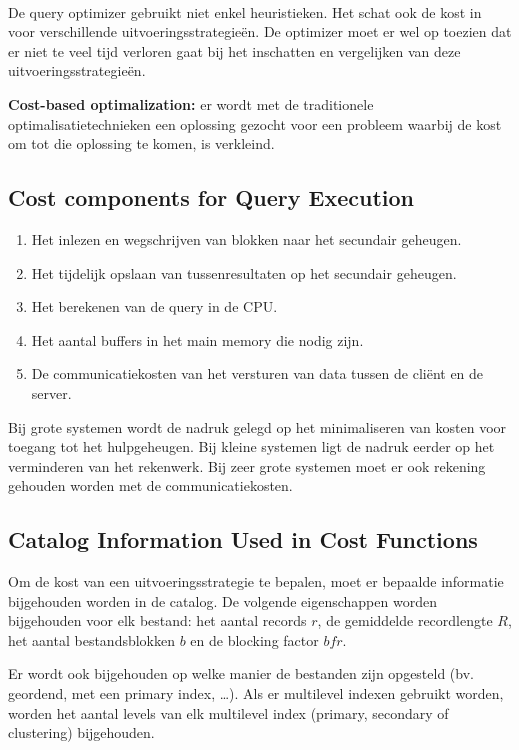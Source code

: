 ~

\noindent De query optimizer gebruikt niet enkel heuristieken. Het schat ook de kost in voor verschillende uitvoeringsstrategie\"en. De optimizer moet er wel op toezien dat er niet te veel tijd verloren gaat bij het inschatten en vergelijken van deze uitvoeringsstrategie\"en.

\textbf{Cost-based optimalization:} er wordt met de traditionele optimalisatietechnieken een oplossing gezocht voor een probleem waarbij de kost om tot die oplossing te komen, is verkleind.


\subsection{Cost components for Query Execution}
\begin{enumerate}
	\item Het inlezen en wegschrijven van blokken naar het secundair geheugen.

	\item Het tijdelijk opslaan van tussenresultaten op het secundair geheugen.

	\item Het berekenen van de query in de CPU.

	\item Het aantal buffers in het main memory die nodig zijn.

	\item De communicatiekosten van het versturen van data tussen de cli\"ent en de server.
\end{enumerate}
Bij grote systemen wordt de nadruk gelegd op het minimaliseren van kosten voor toegang tot het hulpgeheugen. Bij kleine systemen ligt de nadruk eerder op het verminderen van het rekenwerk. Bij zeer grote systemen moet er ook rekening gehouden worden met de communicatiekosten.


\subsection{Catalog Information Used in Cost Functions}
Om de kost van een uitvoeringsstrategie te bepalen, moet er bepaalde informatie bijgehouden worden in de catalog. De volgende eigenschappen worden bijgehouden voor elk bestand: het aantal records $r$, de gemiddelde recordlengte $R$, het aantal bestandsblokken $b$ en de blocking factor $\textit{bfr}$.

Er wordt ook bijgehouden op welke manier de bestanden zijn opgesteld (bv. geordend, met een primary index, \dots). Als er multilevel indexen gebruikt worden, worden het aantal levels van elk multilevel index (primary, secondary of clustering) bijgehouden.

